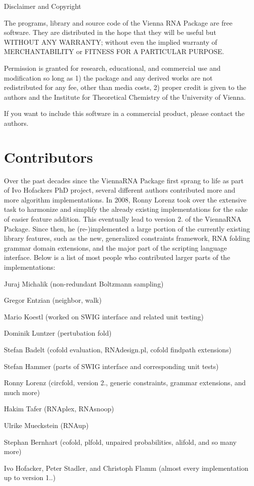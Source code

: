 \begin{DoxyVerbInclude}
			 Disclaimer and Copyright

The programs, library and source code of the Vienna RNA Package are free
software. They are distributed in the hope that they will be useful
but WITHOUT ANY WARRANTY; without even the implied warranty of
MERCHANTABILITY or FITNESS FOR A PARTICULAR PURPOSE.  

Permission is granted for research, educational, and commercial use
and modification so long as 1) the package and any derived works are not
redistributed for any fee, other than media costs, 2) proper credit is
given to the authors and the Institute for Theoretical Chemistry of the 
University of Vienna.

If you want to include this software in a commercial product, please contact 
the authors. 

\end{DoxyVerbInclude}
\hypertarget{index_contributors}{}\section{Contributors}\label{index_contributors}
Over the past decades since the {\ttfamily Vienna\+R\+NA Package} first sprang to life as part of Ivo Hofackers PhD project, several different authors contributed more and more algorithm implementations. In 2008, Ronny Lorenz took over the extensive task to harmonize and simplify the already existing implementations for the sake of easier feature addition. This eventually lead to version 2. of the {\ttfamily Vienna\+R\+NA Package}. Since then, he (re-\/)implemented a large portion of the currently existing library features, such as the new, generalized constraints framework, R\+NA folding grammar domain extensions, and the major part of the scripting language interface. Below is a list of most people who contributed larger parts of the implementations\+:


\begin{DoxyItemize}
\item Juraj Michalik (non-\/redundant Boltzmann sampling)
\item Gregor Entzian (neighbor, walk)
\item Mario Koestl (worked on S\+W\+IG interface and related unit testing)
\item Dominik Luntzer (pertubation fold)
\item Stefan Badelt (cofold evaluation, R\+N\+Adesign.\+pl, cofold findpath extensions)
\item Stefan Hammer (parts of S\+W\+IG interface and corresponding unit tests)
\item Ronny Lorenz (circfold, version 2., generic constraints, grammar extensions, and much more)
\item Hakim Tafer (R\+N\+Aplex, R\+N\+Asnoop)
\item Ulrike Mueckstein (R\+N\+Aup)
\item Stephan Bernhart (cofold, plfold, unpaired probabilities, alifold, and so many more)
\item Ivo Hofacker, Peter Stadler, and Christoph Flamm (almost every implementation up to version 1..)
\end{DoxyItemize}

